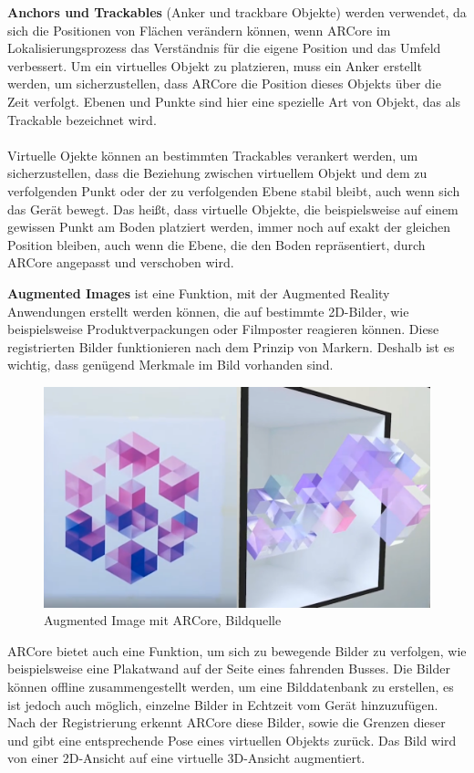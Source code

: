 \textbf{Anchors und Trackables} (Anker und trackbare Objekte) werden verwendet, da sich die Positionen von Flächen verändern können, wenn ARCore im Lokalisierungsprozess das Verständnis für die eigene Position und das Umfeld verbessert. Um ein virtuelles Objekt zu platzieren, muss ein Anker erstellt werden, um sicherzustellen, dass ARCore die Position dieses Objekts über die Zeit verfolgt. Ebenen und Punkte sind hier eine spezielle Art von Objekt, das als \glqq Trackable\grqq{} bezeichnet wird. \\ \\ Virtuelle Ojekte können an bestimmten Trackables verankert werden, um sicherzustellen, dass die Beziehung zwischen virtuellem Objekt und dem zu verfolgenden Punkt oder der zu verfolgenden Ebene stabil bleibt, auch wenn sich das Gerät bewegt. Das heißt, dass virtuelle Objekte, die beispielsweise auf einem gewissen Punkt am Boden platziert werden, immer noch auf exakt der gleichen Position bleiben, auch wenn die Ebene, die den Boden repräsentiert, durch ARCore angepasst und verschoben wird.

\textbf{Augmented Images} ist eine Funktion, mit der Augmented Reality Anwendungen erstellt werden können, die auf bestimmte 2D-Bilder, wie beispielsweise Produktverpackungen oder Filmposter reagieren können. Diese registrierten Bilder funktionieren nach dem Prinzip von Markern. Deshalb ist es wichtig, dass genügend Merkmale im Bild vorhanden sind.\\

\begin{figure}[H]
	\centering
	\includegraphics[scale=0.45]{augmented.png}
	\caption{Augmented Image mit ARCore, Bildquelle \cite{augmented_images}}
\end{figure} 

ARCore bietet auch eine Funktion, um sich zu bewegende Bilder zu verfolgen, wie beispielsweise eine Plakatwand auf der Seite eines fahrenden Busses. Die Bilder können offline zusammengestellt werden, um eine Bilddatenbank zu erstellen, es ist jedoch auch möglich, einzelne Bilder in Echtzeit vom Gerät hinzuzufügen. Nach der Registrierung erkennt ARCore diese Bilder, sowie die Grenzen dieser und gibt eine entsprechende Pose eines virtuellen Objekts zurück. Das Bild wird von einer 2D-Ansicht auf eine virtuelle 3D-Ansicht augmentiert.

